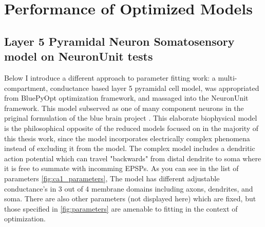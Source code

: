



%


\section{Performance of Optimized Models}

\subsection{Layer 5 Pyramidal Neuron Somatosensory model on NeuronUnit tests}
\cite{van2016bluepyopt}

Below I introduce a different approach to parameter fitting work: a multi-compartment, conductance based layer 5 pyramidal cell model, was appropriated from BluePyOpt optimization framework, and massaged into the NeuronUnit framework. This model subserved as one of many component neurons in the priginal formulation of the blue brain project \cite{markram2015reconstruction}. This elaborate biophysical model is the philosophical opposite of the reduced models focused on in the majority of this thesis work, since the model incorporates electrically complex phenomena instead of excluding it from the model. The complex model includes a dendritic action potential which can travel "backwards" from distal dendrite to soma where it is free to summate with incomming EPSPs. As you can see in the list of parameters \ref{fig:ca1_parameters}, The model has different adjustable conductance's in 3 out of 4 membrane domains including axons, dendrites, and soma. There are also other parameters (not displayed here) which are fixed, but those specified in \ref{fig:parameters} are amenable to fitting in the context of optimization.

